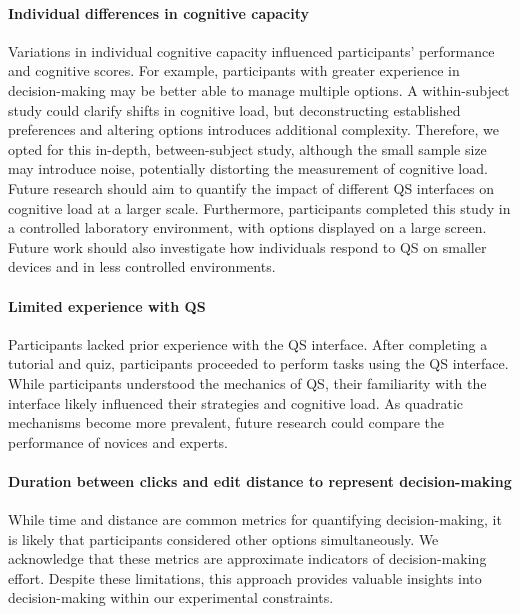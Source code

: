 \paragraph{Individual differences in cognitive capacity}
Variations in individual cognitive capacity influenced participants' performance and cognitive scores. For example, participants with greater experience in decision-making may be better able to manage multiple options.  A within-subject study could clarify shifts in cognitive load, but deconstructing established preferences and altering options introduces additional complexity. Therefore, we opted for this in-depth, between-subject study, although the small sample size may introduce noise, potentially distorting the measurement of cognitive load. Future research should aim to quantify the impact of different QS interfaces on cognitive load at a larger scale. Furthermore, participants completed this study in a controlled laboratory environment, with options displayed on a large screen. Future work should also investigate how individuals respond to QS on smaller devices and in less controlled environments.

\paragraph{Limited experience with QS}
Participants lacked prior experience with the QS interface. After completing a tutorial and quiz, participants proceeded to perform tasks using the QS interface. While participants understood the mechanics of QS, their familiarity with the interface likely influenced their strategies and cognitive load. As quadratic mechanisms become more prevalent, future research could compare the performance of novices and experts.

\paragraph{Duration between clicks and edit distance to represent decision-making}
While time and distance are common metrics for quantifying decision-making, it is likely that participants considered other options simultaneously. We acknowledge that these metrics are approximate indicators of decision-making effort. Despite these limitations, this approach provides valuable insights into decision-making within our experimental constraints.






